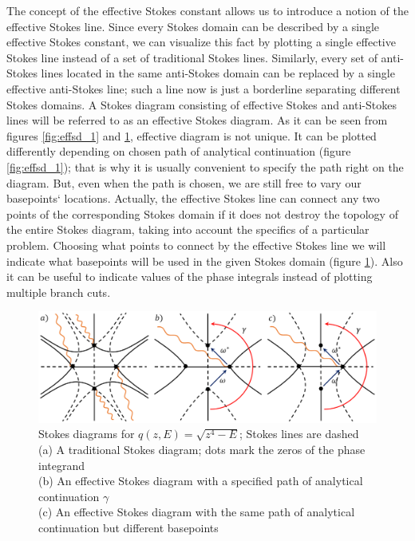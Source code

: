 \documentclass[atmp]{ipart_v1}
\newcommand\fref[1]{figure \ref{#1}}
\begin{document}
The concept of the effective Stokes constant allows us to introduce a notion of the effective Stokes line.
Since every Stokes domain can be described by a single effective Stokes constant, we can visualize this fact 
by plotting a single effective Stokes line instead of a set of traditional Stokes lines. 
Similarly, every set of anti-Stokes lines located in the same anti-Stokes
domain can be replaced by a single effective anti-Stokes line; such a line now is just a borderline 
separating different Stokes domains. A Stokes diagram consisting of effective Stokes and anti-Stokes 
lines will be referred to as an effective Stokes diagram. As it can be seen from figures \ref{fig:effsd_1} 
and \ref{fig:effsd_2}, effective diagram is not unique. 
It can be plotted differently depending on chosen path of analytical 
continuation (\fref{fig:effsd_1}); that is why it is usually convenient to specify 
the path right on the diagram. But, even when the path is chosen, we
are still free to vary our basepoints` locations. Actually, the effective Stokes line can connect any two 
points of the corresponding Stokes domain if it does not destroy the topology of the entire 
Stokes diagram, taking into account the specifics of a particular problem. 
Choosing what points to connect by the effective Stokes line we will indicate what basepoints 
will be used in the given Stokes domain (\fref{fig:effsd_2}). Also it can be useful to indicate 
values of the phase integrals instead of plotting multiple branch cuts.

\begin{figure}
\centering
\noindent
\includegraphics[width=\textwidth]{effsd_2.png}
\caption{
Stokes diagrams for $q(z,E)=\sqrt{z^4-E}$; Stokes lines are dashed
\\
(a) A traditional Stokes diagram; dots mark the zeros of the phase integrand
\\
(b) An effective Stokes diagram with a specified path of analytical continuation $\gamma$
\\
(c) An effective Stokes diagram with the same path of analytical continuation but different basepoints}
\label{fig:effsd_2}
\end{figure} 
\end{document}
